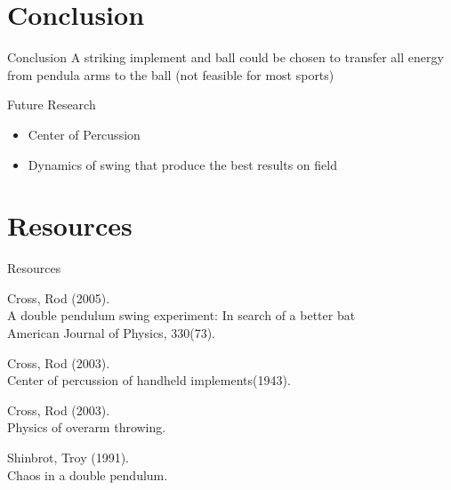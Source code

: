 \documentclass[tikz]{beamer}
\begin{document}




\section{Conclusion}

\begin{frame} {Conclusion}
	A striking implement and ball could be chosen to transfer all energy from pendula arms to the ball (not feasible for most sports)
\end{frame}

\begin{frame} {Future Research}
	\begin{itemize}
		\item Center of Percussion
		\item Dynamics of swing that produce the best results on field
	\end{itemize}
\end{frame}

\section*{Resources}
\begin{frame} {Resources}
	\only<1> {
		\begin{block}{}
		Cross, Rod (2005).\\
		A double pendulum swing experiment: In search of a better bat \\
		American Journal of Physics, 330(73).\\
	\end{block}
	\begin{block}{}
		Cross, Rod (2003).\\
		Center of percussion of handheld implements(1943).\\
	\end{block}
		\begin{block}{}
			Cross, Rod (2003).\\
		Physics of overarm throwing.\\
	\end{block}
		\begin{block}{}
		Shinbrot, Troy (1991).\\
		Chaos in a double pendulum.\\
	\end{block}
}
\end{frame} 
\end{document}
